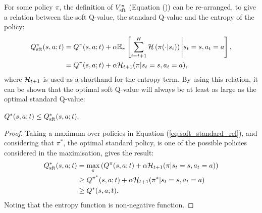     
    
    
    
    
    
    
        For some policy $\pi$, the definition of $V^{\pi}_{{\textnormal{sft}}}$ (Equation ()) can be re-arranged, to give a relation between the soft Q-value, the standard Q-value and the entropy of the policy:
        \begin{align}
            Q^{\pi}_{{\textnormal{sft}}}(s,a;t) &= Q^{\pi}(s,a;t) 
                + \alpha \mathbb{E}_{\pi}\left[
                    \sum_{i=t+1}^H \mathcal{H}\left(\pi(\cdot|s_i)\right) \Bigg| s_t=s, a_t=a
                    \right],  \\
                &= Q^{\pi}(s,a;t) 
                + \alpha\mathcal{H}_{t+1}(\pi|s_t=s,a_t=a), \label{eq:soft_standard_rel}
        \end{align}
        where $\mathcal{H}_{t+1}$ is used as a shorthand for the entropy term. By using this relation, it can be shown that the optimal soft Q-value will always be at least as large as the optimal standard Q-value:
        \begin{lemma} \label{lem:soft_geq_standard}
            $Q^*(s,a;t) \leq Q_{\textnormal{sft}}^*(s,a;t).$
        \end{lemma}
        \begin{proof}
            Taking a maximum over policies in Equation (\ref{eq:soft_standard_rel}), and considering that $\pi^*$, the optimal standard policy, is one of the possible policies considered in the maximisation, gives the result:
            \begin{align}
                Q_{{\textnormal{sft}}}^*(s,a;t) &= \max_\pi \left(Q^{\pi}(s,a;t) + \alpha\mathcal{H}_{t+1}(\pi|s_t=s,a_t=a)\right) \\
                    &\geq Q^{\pi^*}(s,a;t) + \alpha\mathcal{H}_{t+1}(\pi^*|s_t=s,a_t=a) \\
                    &\geq Q^*(s,a;t).
            \end{align} 
            Noting that the entropy function is non-negative function.
        \end{proof}
    
    
    
    
    
    
    
    

